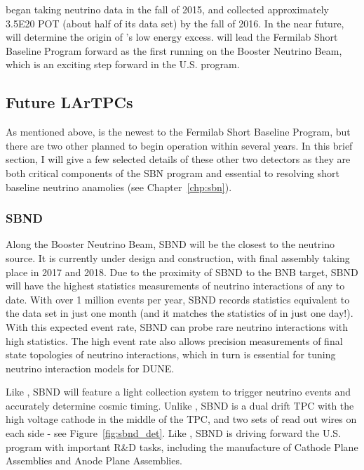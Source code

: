 \uboone began taking neutrino data in the fall of 2015, and collected approximately 3.5E20 POT (about half of its data set) by the fall of 2016.  In the near future, \uboone will determine the origin of \MB's low energy excess.  \uboone will lead the Fermilab Short Baseline Program forward as the first running \lartpc on the Booster Neutrino Beam, which is an exciting step forward in the U.S. \lartpc program.

\FloatBarrier

\subsection{\label{sec:future_tpcs} Future LArTPCs}

As mentioned above, \uboone is the newest \lartpc to the Fermilab Short Baseline Program, but there are two other \lartpcs planned to begin operation within several years.  In this brief section, I will give a few selected details of these other two detectors as they are both critical components of the SBN program and essential to resolving short baseline neutrino anamolies (see Chapter~\ref{chp:sbn}).

\subsubsection{\label{subsec:sbnd} SBND}

Along the Booster Neutrino Beam, SBND will be the \lartpc closest to the neutrino source.  It is currently under design and construction, with final assembly taking place in 2017 and 2018.  Due to the proximity of SBND to the BNB target, SBND will have the highest statistics measurements of neutrino interactions of any \lartpc to date.  With over 1 million events per year, SBND records statistics equivalent to the \uboone data set in just one month (and it matches the statistics of \argoneut in just one day!).  With this expected event rate, SBND can probe rare neutrino interactions with high statistics.  The high event rate also allows precision measurements of final state topologies of neutrino interactions, which in turn is essential for tuning neutrino interaction models for DUNE.

Like \uboone, SBND will feature a light collection system to trigger neutrino events and accurately determine cosmic timing.  Unlike \uboone, SBND is a dual drift TPC with the high voltage cathode in the middle of the TPC, and two sets of read out wires on each side - see Figure~\ref{fig:sbnd_det}.  Like \uboone, SBND is driving forward the U.S. \lartpc program with important R\&D tasks, including the manufacture of Cathode Plane Assemblies and Anode Plane Assemblies.

